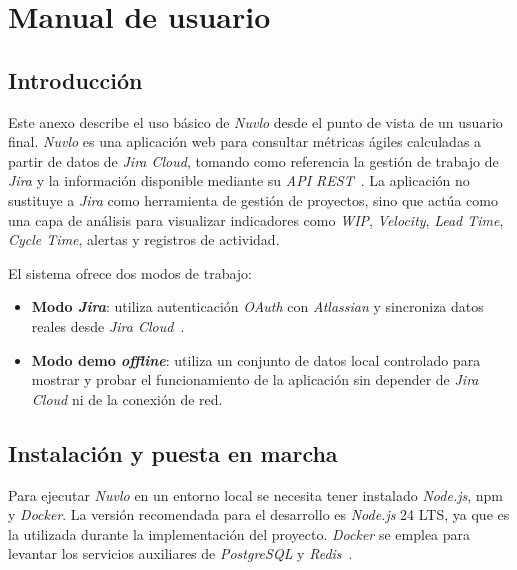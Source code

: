 
\chapter{Manual de usuario}\label{manual-usuario}
\begin{refsection}

\section{Introducción}

Este anexo describe el uso básico de \textit{Nuvlo} desde el punto de vista de un usuario final. \textit{Nuvlo} es una aplicación web para consultar métricas ágiles calculadas a partir de datos de \textit{Jira Cloud}, tomando como referencia la gestión de trabajo de \textit{Jira} y la información disponible mediante su \textit{API REST}~\cite{AtlassianJira,AtlassianJiraRestV3}. La aplicación no sustituye a \textit{Jira} como herramienta de gestión de proyectos, sino que actúa como una capa de análisis para visualizar indicadores como \textit{WIP}, \textit{Velocity}, \textit{Lead Time}, \textit{Cycle Time}, alertas y registros de actividad.

El sistema ofrece dos modos de trabajo:

\begin{itemize}
    \item \textbf{Modo \textit{Jira}}: utiliza autenticación \textit{OAuth} con \textit{Atlassian} y sincroniza datos reales desde \textit{Jira Cloud}~\cite{AtlassianOAuth3LO,AtlassianJiraRestV3}.
    \item \textbf{Modo demo \textit{offline}}: utiliza un conjunto de datos local controlado para mostrar y probar el funcionamiento de la aplicación sin depender de \textit{Jira Cloud} ni de la conexión de red.
\end{itemize}


\section{Instalación y puesta en marcha}

Para ejecutar \textit{Nuvlo} en un entorno local se necesita tener instalado \textit{Node.js}, npm y \textit{Docker}. La versión recomendada para el desarrollo es \textit{Node.js} 24 LTS, ya que es la utilizada durante la implementación del proyecto. \textit{Docker} se emplea para levantar los servicios auxiliares de \textit{PostgreSQL} y \textit{Redis}~\cite{NodeDocs,DockerComposeDocs}.


\end{refsection}
